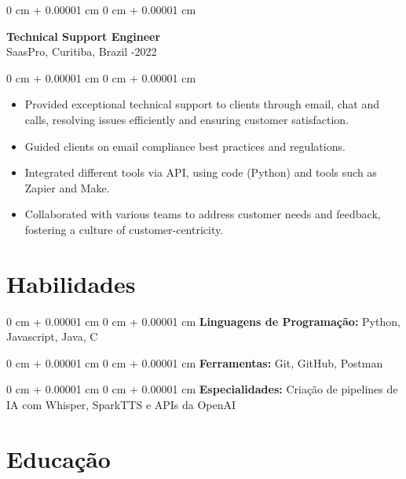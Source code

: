 \documentclass[10pt, letterpaper]{article}
\newenvironment{highlights}{
    \begin{itemize}[
        topsep=0.10 cm,
        parsep=0.10 cm,
        partopsep=0pt,
        itemsep=0pt,
        leftmargin=0 cm + 10pt
    ]
}{
    \end{itemize}
}
\newenvironment{onecolentry}{
    \begin{adjustwidth}{
        0 cm + 0.00001 cm
    }{
        0 cm + 0.00001 cm
    }
}{
    \end{adjustwidth}
}
\begin{document}
\vspace{0.2cm}

\begin{onecolentry}
    \setcolumnwidth{\fill, 4.5cm}
    \begin{paracol}{2}
        \textbf{Technical Support Engineer} \\ SaasPro, Curitiba, Brazil
        \switchcolumn
        -2022
    \end{paracol}
\end{onecolentry}
\vspace{0.10cm}
\begin{onecolentry}
    \begin{highlights}
                \item Provided exceptional technical support to clients through email, chat and calls, resolving issues efficiently and ensuring customer satisfaction.
                \item Guided clients on email compliance best practices and regulations.
                \item Integrated different tools via API, using code (Python) and tools such as Zapier and Make.
                \item Collaborated with various teams to address customer needs and feedback, fostering a culture of customer-centricity.
    \end{highlights}
\end{onecolentry}

\section{Habilidades}
\begin{onecolentry}{\textbf{Linguagens de Programação:} Python, Javascript, Java, C}\end{onecolentry}
\vspace{0.1cm}
\begin{onecolentry}{\textbf{Ferramentas:} Git, GitHub, Postman}\end{onecolentry}
\vspace{0.1cm}
\begin{onecolentry}{\textbf{Especialidades:} Criação de pipelines de IA com Whisper, SparkTTS e APIs da OpenAI}\end{onecolentry}
\section{Educação}
\end{document}
